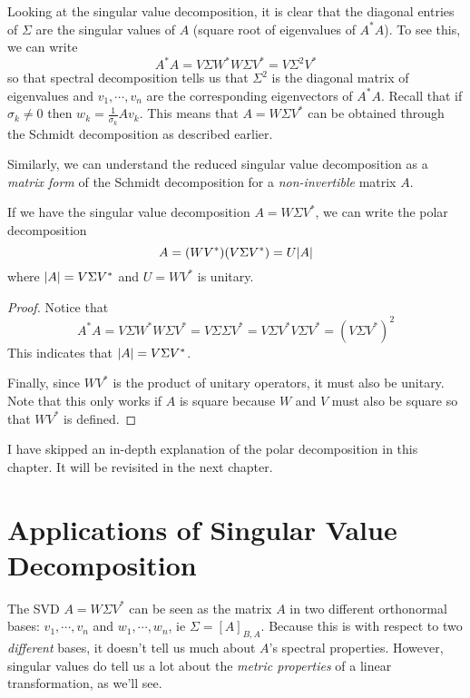 Looking at the singular value decomposition, it is clear that the diagonal entries of $\Sigma$ are the singular values of $A$ (square root of eigenvalues of $A^{*}A$). To see this, we can write 
$$A^{*} A = V \Sigma W^{*} W \Sigma V^{*} = V \Sigma^{2} V^{*}$$
so that spectral decomposition tells us that $\Sigma^{2}$ is the diagonal matrix of eigenvalues and $v_{1}, \cdots, v_{n}$ are the corresponding eigenvectors of $A^{*} A$. Recall that if $\sigma_{k} \neq 0$ then $w_{k} = \frac{1}{\sigma_{k}} Av_{k}$. This means that $A = W \Sigma V^{*}$ can be obtained through the Schmidt decomposition as described earlier. 

Similarly, we can understand the reduced singular value decomposition as a \textit{matrix form} of the Schmidt decomposition for a \textit{non-invertible} matrix $A$. 

\begin{theorem}
If we have the singular value decomposition $A = W \Sigma V^{*}$, we can write the polar decomposition
$$A = (WV^{*}) (V \Sigma V^{*}) = U \lvert A\rvert$$
where $\lvert A\rvert = V \Sigma V^{*}$ and $U = WV^{*}$ is unitary. 
\end{theorem}

\begin{proof}
Notice that 
$$A^{*} A = V \Sigma W^{*} W \Sigma V^{*} = V \Sigma \Sigma V^{*} = V \Sigma V^{*} V \Sigma V^{*} = (V \Sigma V^{*})^{2}$$
This indicates that $\lvert A\rvert = V \Sigma V^{*}$. 

Finally, since $WV^{*}$ is the product of unitary operators, it must also be unitary. Note that this only works if $A$ is square because $W$ and $V$ must also be square so that $WV^{*}$ is defined. 
\end{proof}

I have skipped an in-depth explanation of the polar decomposition in this chapter. It will be revisited in the next chapter. 

\section{Applications of Singular Value Decomposition}

The SVD $A = W \Sigma V^{*}$ can be seen as the matrix $A$ in two different orthonormal bases: $v_{1}, \cdots, v_{n}$ and $w_{1}, \cdots, w_{n}$, ie $\Sigma = [A]_{B, A}$. Because this is with respect to two \textit{different} bases, it doesn't tell us much about $A$'s spectral properties. However, singular values do tell us a lot about the \textit{metric properties} of a linear transformation, as we'll see. 

